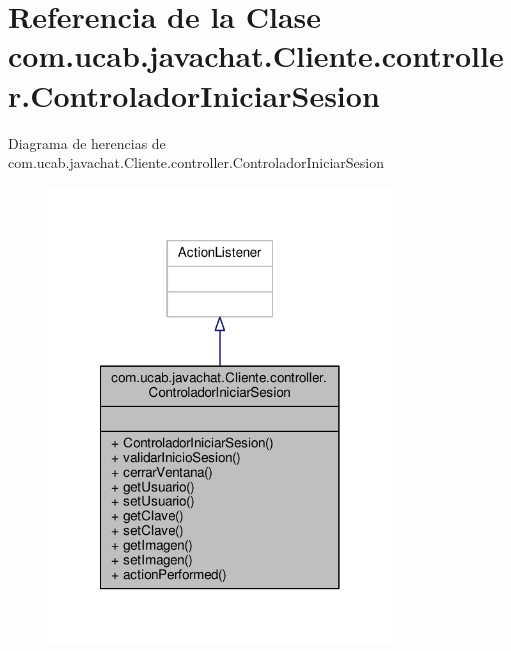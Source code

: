 \hypertarget{classcom_1_1ucab_1_1javachat_1_1_cliente_1_1controller_1_1_controlador_iniciar_sesion}{\section{Referencia de la Clase com.\-ucab.\-javachat.\-Cliente.\-controller.\-Controlador\-Iniciar\-Sesion}
\label{classcom_1_1ucab_1_1javachat_1_1_cliente_1_1controller_1_1_controlador_iniciar_sesion}
}


Diagrama de herencias de com.\-ucab.\-javachat.\-Cliente.\-controller.\-Controlador\-Iniciar\-Sesion\nopagebreak
\begin{figure}[H]
\begin{center}
\leavevmode
\includegraphics[width=258pt]{classcom_1_1ucab_1_1javachat_1_1_cliente_1_1controller_1_1_controlador_iniciar_sesion__inherit__graph}
\end{center}
\end{figure}


